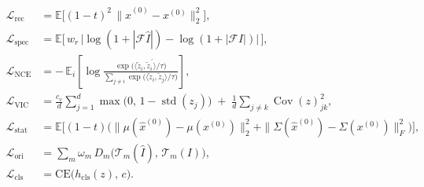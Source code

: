 \documentclass[preprint,12pt]{elsarticle}
\begin{document}
\begin{align}
  \mathcal{L}_{\mathrm{rec}}  &= \mathbb{E}\big[ (1-t)^{2}\, \|\hat{x}^{(0)} - x^{(0)}\|_2^2 \big] , \label{eq:loss-rec}\\
  \mathcal{L}_{\mathrm{spec}} &= \mathbb{E}\big[\, w_r\, \big| \log(1{+}|\mathcal{F}\hat{I}|) - \log(1{+}|\mathcal{F}I|) \big|\, \big] , \label{eq:loss-spec}\\
  \mathcal{L}_{\mathrm{NCE}}  &= -\,\mathbb{E}_i \left[ \log \frac{\exp\!\big(\langle \tilde{z}_i, \tilde{z}_i^{\,\prime} \rangle / \tau\big)}{\sum_{j \neq i} \exp\!\big(\langle \tilde{z}_i, \tilde{z}_j \rangle / \tau\big)} \right] , \label{eq:loss-nce}\\
  \mathcal{L}_{\mathrm{VIC}}  &= \frac{c_v}{d} \sum_{j=1}^{d} \max\!\big(0,\, 1 - \operatorname{std}(z_j)\big) \;+\; \frac{1}{d} \sum_{j \neq k} \operatorname{Cov}(z)_{jk}^{2} , \label{eq:loss-vic}\\
  \mathcal{L}_{\mathrm{stat}} &= \mathbb{E}\big[ (1-t) \big( \|\mu(\hat{x}^{(0)}) - \mu(x^{(0)})\|_2^2 + \|\Sigma(\hat{x}^{(0)}) - \Sigma(x^{(0)})\|_F^2 \big) \big] , \label{eq:loss-stat}\\
  \mathcal{L}_{\mathrm{ori}}  &= \textstyle\sum_m \omega_m\, D_m\big( \mathcal{T}_m(\hat{I}),\, \mathcal{T}_m(I) \big) , \label{eq:loss-ori}\\
  \mathcal{L}_{\mathrm{cls}}  &= \mathrm{CE}\big( h_{\mathrm{cls}}(z),\, c \big) . \label{eq:loss-cls}
\end{align}
\end{document}
